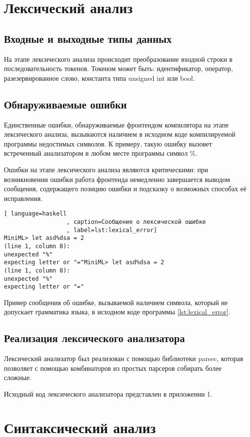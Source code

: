 \documentclass[a4paper,12pt]{article}
\numberwithin{equation}{section}
\begin{document}
\section{Лексический анализ}
\subsection{Входные и выходные типы данных}
На этапе лексического анализа происходит преобразование входной строки
в последовательность токенов. Токеном может быть: идентификатор, оператор,
разезервированное слово, константа типа unsigned int или bool.

\subsection{Обнаруживаемые ошибки}
Единственные ошибки, обнаруживаемые фронтендом компилятора на этапе
лексического анализа, вызываются наличием в исходном коде компилируемой
программы недостимых символов. К примеру, такую ошибку вызовет встреченный
анализатором в любом месте программы символ \%.


Ошибки на этапе лексического анализа являются критическими: при возникновении
ошибки работа фронтенда немедленно завершается выводом сообщения, содержащего
позицию ошибки и подсказку о возможных способах её исправления.

\begin{lstlisting}[ language=haskell
                  , caption=Сообщение о лексической ошибке
                  , label=lst:lexical_error]
MiniML> let asd%dsa = 2
(line 1, column 8):
unexpected "%"
expecting letter or "="MiniML> let asd%dsa = 2
(line 1, column 8):
unexpected "%"
expecting letter or "="
\end{lstlisting}

Пример сообщения об ошибке, вызываемой наличием символа, который не
допускает грамматика языка, в исходном коде программы \ref{lst:lexical_error}.

\subsection{Реализация лексического анализатора}
Лексический анализатор был реализован с помощью библиотеки parsec,
которая позволяет с помощью комбинаторов из простых парсеров собирать
более сложные.


Исходный код лексического анализатора представлен в приложении 1.

\section{Синтаксический анализ}
\end{document}
